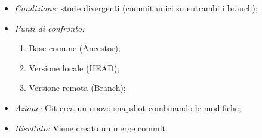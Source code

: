\documentclass[12pt]{article}
\begin{document}
\begin{itemize}
        \begin{itemize}
          \item \textit{Condizione:} storie divergenti (commit unici su entrambi i branch);
          \item \textit{Punti di confronto:}
            \begin{enumerate}
              \item Base comune (Ancestor);
              \item Versione locale (HEAD);
              \item Versione remota (Branch);
            \end{enumerate}
          \item \textit{Azione:} Git crea un nuovo snapshot combinando le modifiche;
          \item \textit{Risultato:} Viene creato un merge commit.
        \end{itemize}
    \end{itemize}
  
\end{document}
